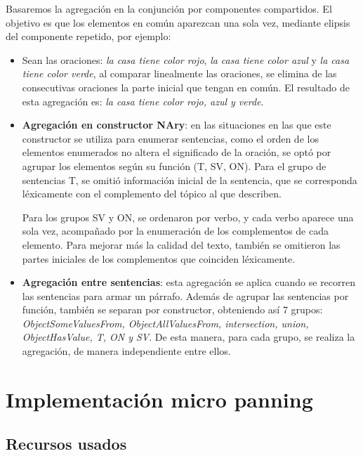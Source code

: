 Basaremos la agregación en la conjunción por componentes compartidos. El objetivo es que los elementos en común aparezcan una sola vez, mediante elipsis del componente repetido, por ejemplo:
\begin{itemize}
    \item Sean las oraciones: \emph{la casa tiene color rojo}, \emph{la casa tiene color azul} y \emph{la casa tiene color verde}, al comparar linealmente las oraciones, se elimina de las consecutivas oraciones la parte inicial que tengan en común. El resultado de esta agregación es: \emph{la casa tiene color rojo, azul y verde}.
\end{itemize}
    
\begin{itemize}
    \item {\bf Agregación en constructor NAry}: en las situaciones en las que este constructor se utiliza para enumerar sentencias, como el orden de los elementos enumerados no altera el significado de la oración, se optó por agrupar los elementos según su función (T, SV, ON). Para el grupo de sentencias T, se omitió información inicial de la sentencia, que se corresponda léxicamente con el complemento del tópico al que describen. 
    
    Para los grupos SV y ON, se ordenaron por verbo, y cada verbo aparece una sola vez, acompañado por la enumeración de los complementos de cada elemento. Para mejorar más la calidad del texto, también se omitieron las partes iniciales de los complementos que coinciden léxicamente.
    
    \item {\bf Agregación entre sentencias}: esta agregación se aplica cuando se recorren las sentencias para armar un párrafo. Además de agrupar las sentencias por función, también se separan por constructor, obteniendo así 7 grupos: \emph{ObjectSomeValuesFrom, ObjectAllValuesFrom, intersection, union, ObjectHasValue, T, ON y SV}. De esta manera, para cada grupo, se realiza la agregación, de manera independiente entre ellos.
\end{itemize}

\section{Implementación micro panning}

\subsection{Recursos usados}

